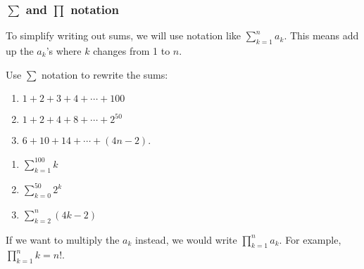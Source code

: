 \documentclass[11pt,]{book}
\theoremstyle{ptxplainnotitle}
\theoremstyle{ptxplaintitle}
\theoremstyle{ptxdefinitionnotitle}
\theoremstyle{ptxdefinitiontitle}
\theoremstyle{ptxdefinitionnotitle}
\theoremstyle{ptxdefinitiontitle}
\theoremstyle{ptxdefinitionnotitle}
\theoremstyle{ptxdefinitiontitle}
\theoremstyle{ptxdefinitiontitlenonumber}
\theoremstyle{ptxdefinitiontitlenonumber}
\numberwithin{equation}{chapter}
\renewcommand{\d}{\displaystyle}
\begin{document}
\subsubsection[{\(\sum\) and \(\prod\) notation}]{\(\sum\) and \(\prod\) notation}\label{subsubsection-3}
\hypertarget{p-216}{}%
To simplify writing out sums, we will use notation like \(\d\sum_{k=1}^n a_k\). This means add up the \(a_k\)'s where \(k\) changes from 1 to \(n\).%
\begin{example}\label{example-13}
\hypertarget{p-217}{}%
Use \(\sum\) notation to rewrite the sums:%
\par
\hypertarget{p-218}{}%
\leavevmode%
\begin{enumerate}
\item\hypertarget{li-114}{}\(1 + 2 + 3 + 4 + \cdots + 100\)%
\item\hypertarget{li-115}{}\(1 + 2 + 4 + 8 + \cdots + 2^{50}\)%
\item\hypertarget{li-116}{}\(6 + 10 + 14 + \cdots + (4n - 2)\).%
\end{enumerate}
%
\par\smallskip%
\noindent\textbf{}\hypertarget{solution-24}{}\hypertarget{p-219}{}%
\leavevmode%
\begin{enumerate}
\item\hypertarget{li-117}{}\(\d\sum_{k=1}^{100} k\)%
\item\hypertarget{li-118}{}\(\d\sum_{k=0}^{50} 2^k\)%
\item\hypertarget{li-119}{}\(\d\sum_{k=2}^{n} (4k -2)\)%
\end{enumerate}
%
\end{example}
\hypertarget{p-220}{}%
If we want to multiply the \(a_k\) instead, we would write \(\d\prod_{k=1}^n a_k\). For example, \(\d\prod_{k=1}^n k = n!\).%
\typeout{************************************************}
\typeout{************************************************}
\end{document}
